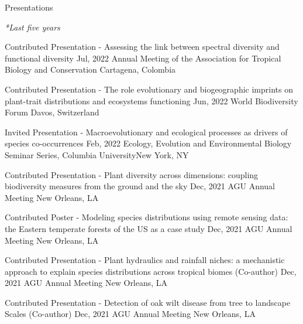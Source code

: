 \documentclass{resume} %
\begin{document}

\begin{rSection}{Presentations} 

\em{*Last five years}

\begin{sSubsection}{Contributed Presentation - Assessing the link between spectral diversity and functional diversity}{ \hfill }{Jul, 2022}{ Annual Meeting of the Association for Tropical Biology and Conservation }{Cartagena, Colombia}
\end{sSubsection}

\begin{sSubsection}{Contributed Presentation - The role evolutionary and biogeographic imprints on plant-trait distributions and ecosystems functioning}{ \hfill }{Jun, 2022}{ World Biodiversity Forum }{Davos, Switzerland}
\end{sSubsection}

\begin{sSubsection}{Invited Presentation - Macroevolutionary and ecological processes as drivers of species co-occurrences}{ \hfill }{Feb, 2022}{ Ecology, Evolution and Environmental Biology Seminar Series, Columbia University}{New York, NY}
\end{sSubsection}

\begin{sSubsection}{Contributed Presentation - Plant diversity across dimensions: coupling biodiversity measures from the ground and the sky}{ \hfill }{Dec, 2021}{ AGU Annual Meeting }{New Orleans, LA}
\end{sSubsection}

\begin{sSubsection}{Contributed Poster - Modeling species distributions using remote sensing data: the Eastern temperate forests of the US as a case study}{ }{Dec, 2021}{ AGU Annual Meeting }{New Orleans, LA}
\end{sSubsection}

\begin{sSubsection}{Contributed Presentation - Plant hydraulics and rainfall niches: a mechanistic approach to explain species distributions across tropical biomes}{ (Co-author) }{Dec, 2021}{ AGU Annual Meeting }{New Orleans, LA}
\end{sSubsection}

\begin{sSubsection}{Contributed Presentation - Detection of oak wilt disease from tree to landscape Scales}{ (Co-author) }{Dec, 2021}{ AGU Annual Meeting }{New Orleans, LA}
\end{sSubsection}


\end{rSection}
\end{document}
